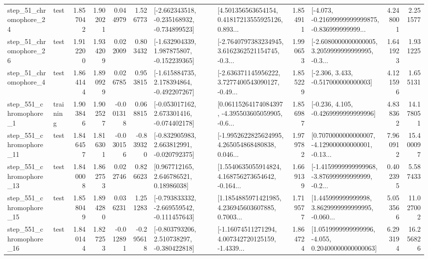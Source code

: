 \begin{tabular}{llrrrrllrlrr}
   step\_51\_chromophore\_24 &      test &      1.857042 &    1.902021 &      0.044979 &  1.526773 &  [-2.662343518, -0.235168932, -0.734899523] &  [4.501356563654154, 0.41817213555925126, 0.893... &       1.854911 &  [-4.073, -0.21699999999999875, -0.836999999999... &            4.248001 &          2.251577 \\
   step\_51\_chromophore\_26 &      test &      1.912200 &    1.934209 &      0.022009 &  0.803432 &   [-1.632904339, 1.987875807, -0.152239365] &  [-2.7640797383234945, 3.6162362521154745, -0.3... &       1.990653 &  [-2.6080000000000005, 3.2059999999999995, -0.3... &            1.641923 &          1.931225 \\
    step\_51\_chromophore\_4 &      test &      1.864144 &    1.890929 &      0.026785 &  0.953815 &   [-1.615884735, 2.178394864, -0.492207267] &  [-2.636371145956222, 3.7277400543090127, -0.49... &       1.855229 &                [-2.306, 3.433, -0.517000000000003] &            4.121596 &          1.655131 \\
   step\_551\_chromophore\_1 &  training &      1.903846 &    1.902527 &     -0.001318 &  0.068815 &   [-0.053017162, 2.673301416, -0.074402178] &  [0.06115264174084397, -4.395503605059905, -0.6... &       1.856987 &               [-0.236, 4.105, -0.4269999999999996] &            4.838362 &         14.178051 \\
  step\_551\_chromophore\_11 &      test &      1.846457 &    1.816301 &     -0.030156 & -0.839320 &   [-0.832905983, 2.663812991, -0.020792375] &  [-1.9952622825624995, 4.265054868480838, 0.046... &       1.979782 &  [0.7070000000000007, -4.129000000000001, -0.13... &            7.960912 &         15.400097 \\
  step\_551\_chromophore\_13 &      test &      1.840008 &    1.862753 &      0.022746 &  0.826623 &      [0.967712165, 2.646786521, 0.18986038] &  [1.5540635055914824, 4.168756273654642, -0.164... &       1.669139 &  [-1.4159999999999968, -3.876999999999999, -0.2... &            0.402395 &          5.587433 \\
  step\_551\_chromophore\_15 &      test &      1.858049 &    1.894280 &      0.036231 &  1.251283 &  [-0.793833332, -2.669559542, -0.111457643] &  [1.1854885971421985, 4.236945603607885, 0.7003... &       1.719577 &  [1.445999999999998, 3.8629999999999995, -0.060... &            5.053566 &         11.027002 \\
  step\_551\_chromophore\_16 &      test &      1.840144 &    1.827253 &     -0.012891 & -0.295618 &   [-0.803793206, 2.510738297, -0.380422818] &  [-1.16074511271294, 4.007342720125159, -1.4339... &       1.864724 &  [1.0519999999999996, -4.055, 0.20400000000000063] &            6.293194 &         16.256826 \\

\end{tabular}
